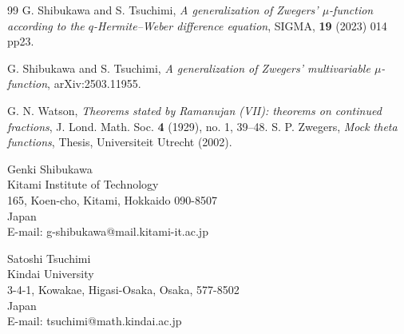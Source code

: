 \documentclass[a4paper]{article}
\numberwithin{equation}{section}
\theoremstyle{plain}
\begin{document}
\begin{thebibliography}{99}
{G. Shibukawa and S. Tsuchimi}, 
{\em{A generalization of Zwegers' $\mu$-function according to the $q$-Hermite--Weber difference equation}}, 
{SIGMA, {\bf{19}} (2023) 014 pp23.}

{G. Shibukawa and S. Tsuchimi}, 
{\em{A generalization of Zwegers' multivariable $\mu$-function}}, 
{arXiv:2503.11955}. 

{G. N. Watson}, 
{\em Theorems stated by Ramanujan (V\hspace{-1.2pt}I\hspace{-1.2pt}I): theorems on continued fractions}, 
{J. Lond. Math. Soc. {\bf{4}} (1929), no. 1, 39--48}. 
{S. P. Zwegers}, 
{\em Mock theta functions}, 
{Thesis, Universiteit Utrecht (2002)}. 
\end{thebibliography}

\medskip
\begin{flushleft}
Genki Shibukawa\\ 
Kitami Institute of Technology\\
165, Koen-cho, Kitami, Hokkaido 090-8507\\
Japan\\
E-mail: g-shibukawa@mail.kitami-it.ac.jp\\
\end{flushleft}

\medskip 
\begin{flushleft}
Satoshi Tsuchimi \\
Kindai University \\
3-4-1, Kowakae, Higasi-Osaka, Osaka, 577-8502\\
Japan \\
E-mail: tsuchimi@math.kindai.ac.jp
\end{flushleft}
\end{document}
